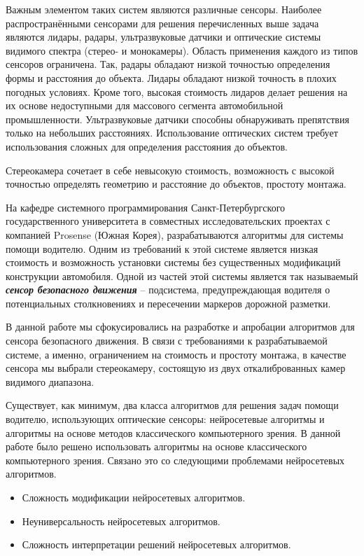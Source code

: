 \documentclass[aps,%
14pt,%
final,%
oneside,
onecolumn,%
musixtex, %
superscriptaddress,%
centertags]{extarticle} %
\begin{document}
Важным элементом таких систем являются различные сенсоры. Наиболее распространёнными сенсорами для решения перечисленных выше задача являются лидары, радары, ультразвуковые датчики и оптические системы видимого спектра (стерео- и монокамеры). Область применения каждого из типов сенсоров ограничена\cite{lu2005technical}\cite{ziebinski2016survey}. Так, радары обладают низкой точностью определения формы и расстояния до объекта. Лидары обладают низкой точность в плохих погодных условиях. Кроме того, высокая стоимость лидаров делает решения на их основе недоступными для массового сегмента автомобильной промышленности. Ультразвуковые датчики способны обнаруживать препятствия только на небольших расстояниях. Использование оптических систем требует использования сложных для определения расстояния до объектов. 

Стереокамера сочетает в себе невысокую стоимость, возможность с высокой точностью определять геометрию и расстояние до объектов, простоту монтажа.


На кафедре системного программирования Санкт-Петербургского государственного университета в совместных исследовательских проектах с компанией Prosense (Южная Корея), разрабатываются алгоритмы для системы помощи водителю. Одним из требований к этой системе является низкая стоимость и возможность установки системы без существенных модификаций конструкции автомобиля. Одной из частей этой системы является так называемый \textit{\textbf{сенсор безопасного движения}} -- подсистема, предупреждающая водителя о потенциальных столкновениях и пересечении маркеров дорожной разметки.

В данной работе мы сфокусировались на разработке и апробации алгоритмов для сенсора безопасного движения. В связи с требованиями к разрабатываемой системе, а именно, ограничением на стоимость и простоту монтажа, в качестве сенсора мы выбрали стереокамеру, состоящую из двух откалиброванных камер видимого диапазона.

Существует, как минимум, два класса алгоритмов для решения задач помощи водителю, использующих оптические сенсоры: нейросетевые алгоритмы и алгоритмы на основе методов классического компьютерного зрения. В данной работе было решено использовать алгоритмы на основе классического компьютерного зрения. Связано это со следующими проблемами нейросетевых алгоритмов.\cite{lipton2016mythos}
\begin{itemize}
\item Сложность модификации нейросетевых алгоритмов.
\item Неуниверсальность нейросетевых алгоритмов.
\item Сложность интерпретации решений нейросетевых алгоритмов.
\end{itemize}
\end{document}

